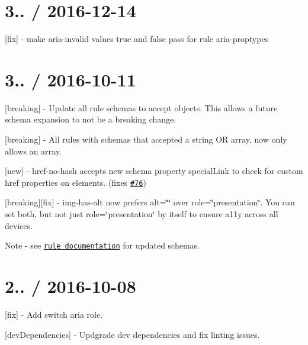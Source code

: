 \section*{3.. / 2016-\/12-\/14 }


\begin{DoxyItemize}
\item \mbox{[}fix\mbox{]} -\/ make {\ttfamily aria-\/invalid} values true and false pass for rule {\ttfamily aria-\/proptypes}
\end{DoxyItemize}

\section*{3.. / 2016-\/10-\/11 }


\begin{DoxyItemize}
\item \mbox{[}breaking\mbox{]} -\/ Update all rule schemas to accept objects. This allows a future schema expansion to not be a breaking change.
\item \mbox{[}breaking\mbox{]} -\/ All rules with schemas that accepted a string OR array, now only allows an array.
\item \mbox{[}new\mbox{]} -\/ {\ttfamily href-\/no-\/hash} accepts new schema property {\ttfamily special\+Link} to check for custom {\ttfamily href} properties on elements. (fixes \href{https://github.com/evcohen/eslint-plugin-jsx-a11y/issues/76}{\tt \#76})
\item \mbox{[}breaking\mbox{]}\mbox{[}fix\mbox{]} -\/ {\ttfamily img-\/has-\/alt} now prefers {\ttfamily alt=\char`\"{}\char`\"{}} over {\ttfamily role=\char`\"{}presentation\char`\"{}}. You can set both, but not just {\ttfamily role=\char`\"{}presentation\char`\"{}} by itself to ensure a11y across all devices.
\end{DoxyItemize}

Note -\/ see \href{https://github.com/evcohen/eslint-plugin-jsx-a11y/tree/master/docs/rules}{\tt rule documentation} for updated schemas.

\section*{2.. / 2016-\/10-\/08 }


\begin{DoxyItemize}
\item \mbox{[}fix\mbox{]} -\/ Add {\ttfamily switch} aria role.
\item \mbox{[}dev\+Dependencies\mbox{]} -\/ Updgrade dev dependencies and fix linting issues.
\end{DoxyItemize}

